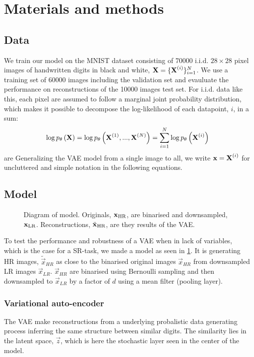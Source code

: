 \section{Materials and methods}
\label{sec:method}

\subsection{Data}
\label{sub:data}
We train our model on the MNIST dataset \cite{MNIST} consisting of 70000 i.i.d. $28 \times 28$ pixel images of handwritten digits in black and white, $\bm{\mathrm{X}} = \{\bm{\mathrm{X}}^{(i)}\}^N_{i=1}$. We use a training set of 60000 images including the validation set and evauluate the performance on reconstructions of the 10000 images test set. 
For i.i.d. data like this, each pixel are assumed to follow a marginal joint probability distribution, which makes it possible to decompose the log-likelihood of each datapoint, $i$, in a sum:
\begin{equation}
	\log p_{\theta}\left(\bm{\mathrm{X}}\right) = \log p_{\theta}\left(\bm{\mathrm{X}}^{(1)}, ..., \bm{\mathrm{X}}^{(N)}\right) = \sum^N_{i=1} \log p_{\theta}\left(\bm{\mathrm{X}}^{(i)}\right) 
\end{equation}are 
Generalizing the VAE model from a single image to all, we write $\bm{\mathrm{x}} = \bm{\mathrm{X}}^{(i)}$ for uncluttered and simple notation in the following equations.

\subsection{Model}
\label{sub:the_model}

\begin{figure*}
	\centering
	
	\caption{Diagram of model. Originals, $\bm{\mathrm{x}}_{\text{HR}}$, are binarised and downsampled, $\bm{\mathrm{x}}_{\text{LR}}$. Reconstructions, $\tilde{\bm{\mathrm{x}}}_{\text{HR}}$, are they results of the VAE.}
	\label{fig:diagram}
\end{figure*}

To test the performance and robustness of a VAE when in lack of variables, which is the case for a SR-task, we made a model as seen in \ref{fig:diagram}. It is generating HR images, $\tilde{\vec{x}}_{HR}$ as close to the binarised original images $\vec{x}_{HR}$ from downsampled LR images $\vec{x}_{LR}$. $\vec{x}_{HR}$ are binarised using Bernoulli sampling and then downsampled to $\vec{x}_{LR}$ by a factor of $d$ using a mean filter (pooling layer).

\subsubsection{Variational auto-encoder}
\label{ssub:vae}
The VAE make reconstructions from a underlying probalistic data generating process inferring the same structure between similar digits. The similarity lies in the latent space, $\vec{z}$, which is here the stochastic layer seen in the center of the model. 

